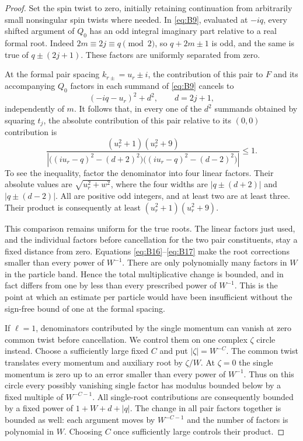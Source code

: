 \begin{proof}
Set the spin twist to zero, initially retaining continuation from
arbitrarily small nonsingular spin twists where needed.  In
\eqref{eq:B9}, evaluated at $-iq$, every shifted argument of $Q_0$
has an odd integral imaginary part relative to a real formal root.
Indeed $2m\equiv2j\equiv q\pmod2$, so $q+2m\pm1$ is odd, and the
same is true of $q\pm(2j+1)$.  These factors are uniformly separated
from zero.

At the formal pair spacing $k_{r\pm}=u_r\pm i$, the contribution of
this pair to $F$ and its accompanying $Q_0$ factors in each summand of
\eqref{eq:B9} cancels to
\[
 (-iq-u_r)^2+d^2,\qquad d=2j+1,
\]
independently of $m$.  It follows that, in every one of the $d^2$
summands obtained by squaring $t_j$, the absolute contribution of this
pair relative to its $(0,0)$ contribution is
\[
 \frac{(u_r^2+1)(u_r^2+9)}
 {\left|\bigl((iu_r-q)^2-(d+2)^2\bigr)
              \bigl((iu_r-q)^2-(d-2)^2\bigr)\right|}
 \le1.
\]
To see the inequality, factor the denominator into four linear factors.
Their absolute values are $\sqrt{u_r^2+w^2}$, where the four widths are
$|q\pm(d+2)|$ and $|q\pm(d-2)|$.  All are positive odd integers, and
at least two are at least three.  Their product is consequently at
least $(u_r^2+1)(u_r^2+9)$.

This comparison remains uniform for the true roots.  The linear factors
just used, and the individual factors before cancellation for the two
pair constituents, stay a fixed distance from zero.  Equations
\eqref{eq:B16}--\eqref{eq:B17} make the root corrections smaller than
every power of $W^{-1}$.  There are only polynomially many factors in
$W$ in the particle band.  Hence the total multiplicative change is
bounded, and in fact differs from one by less than every prescribed
power of $W^{-1}$.  This is the point at which an estimate per particle
would have been insufficient without the sign-free bound of one at the
formal spacing.

If $\ell=1$, denominators contributed by the single momentum can vanish
at zero common twist before cancellation.  We control them on one
complex $\zeta$ circle instead.  Choose a sufficiently large fixed
$C$ and put $|\zeta|=W^{-C}$.  The common twist translates every
momentum and auxiliary root by $\zeta/W$.  At $\zeta=0$ the single
momentum is zero up to an error smaller than every power of $W^{-1}$.
Thus on this circle every possibly vanishing single factor has modulus
bounded below by a fixed multiple of $W^{-C-1}$.  All single-root
contributions are consequently bounded by a fixed power of
$1+W+d+|q|$.  The change in all pair factors together is bounded as
well: each argument moves by $W^{-C-1}$ and the number of factors is
polynomial in $W$.  Choosing $C$ once sufficiently large controls their
product.


\end{proof}
